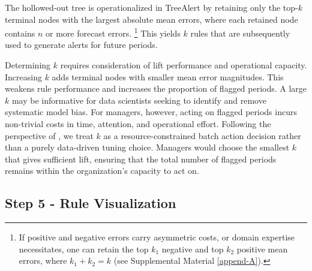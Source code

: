 \documentclass[12pt]{article}
\begin{document}
The hollowed-out tree is operationalized in TreeAlert by retaining only the top-$k$ %
terminal nodes with the largest absolute mean errors, where each retained node contains $n$ or more forecast errors.%
\footnote{If positive and negative errors carry asymmetric costs, or domain expertise necessitates, one can retain the top $k_1$ negative and top $k_2$ positive mean errors, where $k_1 + k_2 = k$ (see Supplemental Material \ref{append-A}).} This yields $k$ rules that are subsequently used to generate alerts for future periods.

Determining $k$ requires consideration of lift performance and operational capacity. Increasing $k$ adds %
terminal nodes with %
smaller mean error magnitudes. This weakens rule performance and increases the proportion of flagged periods. A large $k$ may be informative for data scientists seeking to identify and remove systematic model bias. For managers, however, acting on flagged periods incurs non-trivial costs in time, attention, and operational effort. Following the perspective of \citet{liftupandact}, we treat $k$ as a resource-constrained batch action decision rather than a purely data-driven tuning choice. %
Managers would choose the smallest $k$ that gives sufficient lift, %
ensuring that the total number of flagged periods remains within the organization's capacity to act on.


\subsection{Step 5 - Rule Visualization}
\label{subsec-step5}
\end{document}

